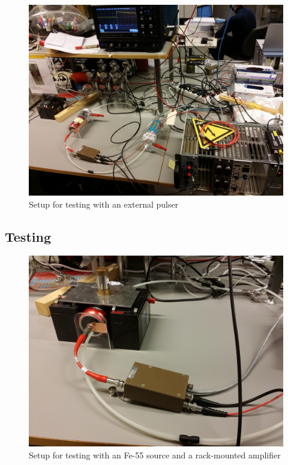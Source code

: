 \documentclass[a4paper]{article}
\begin{document}
\begin{figure}[ht!]
\centering
\includegraphics[width=\textwidth]{fig/IMG_20201130_135000.jpg}
\caption{Setup for testing with an external pulser}
\end{figure}


\FloatBarrier
\subsection{Testing}
\label{setup_testing}

\begin{figure}[ht!]
\centering
\includegraphics[width=\textwidth]{fig/IMG_20201130_144418.jpg}
\caption{Setup for testing with an Fe-55 source and a rack-mounted amplifier}
\end{figure}
\end{document}
